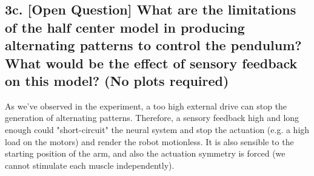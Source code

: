 \documentclass{cmc}
\begin{document}


\subsection*{3c. [Open Question] What are the limitations of the half
  center model in producing alternating patterns to control the
  pendulum? What would be the effect of sensory feedback on this
  model? (No plots required)}
\label{sec:4d}

As we've observed in the experiment, a too high external drive can stop the generation of alternating patterns. Therefore, a sensory feedback high and long enough could "short-circuit" the neural system and stop the actuation (e.g. a high load on the motors) and render the robot motionless. It is also sensible to the starting position of the arm, and also the actuation symmetry is forced (we cannot stimulate each muscle independently).
\end{document}
